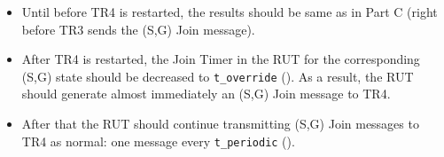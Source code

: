 \documentclass[11pt]{report}
\begin{document}

\begin{itemize}

  \item Until before TR4 is restarted, the results should
  be same as in Part C (right before TR3 sends the (S,G) Join message).

  \item After TR4 is restarted,
  the Join Timer in the RUT for the corresponding (S,G) state
  should be decreased to \verb=t_override= ({\PimsmTOverride}). As a result,
  the RUT should generate almost immediately an (S,G) Join message to TR4.

  \item After that the RUT should continue transmitting 
  (S,G) Join messages to TR4 as normal: one message every \verb=t_periodic=
  ({\PimsmTPeriodic}).

\end{itemize}

\end{document}
